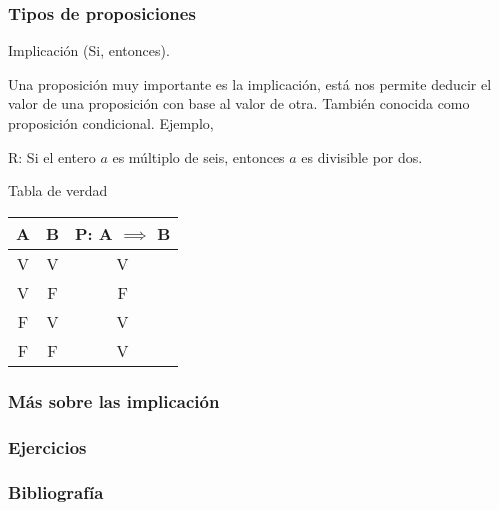 \documentclass[10pt]{beamer}
\begin{document}
    \begin{frame}
        \frametitle{Tipos de proposiciones}
        Implicación (Si, entonces).

        Una proposición muy importante es la implicación, está nos permite deducir el valor de una proposición con base
        al valor de otra.
        También conocida como proposición condicional. Ejemplo,
        \begin{center}
            R: Si el entero $a$ es múltiplo de seis, entonces $a$ es divisible por dos.
        \end{center}
        Tabla de verdad
        \begin{center}
            \begin{tabular}{| c | c || c |}
                \hline
                A & B & P: A $\implies$ B \\\hline\hline
                V & V & V\\\hline
                V & F & F\\\hline
                F & V & V\\\hline
                F & F & V\\\hline
            \end{tabular}
        \end{center}
    \end{frame}

    \begin{frame}
        \frametitle{Más sobre las implicación}
    \end{frame}


    \begin{frame}
        \frametitle{Ejercicios}
    \end{frame}

    \begin{frame}
        \frametitle{Bibliografía}
    \end{frame}
\end{document}
